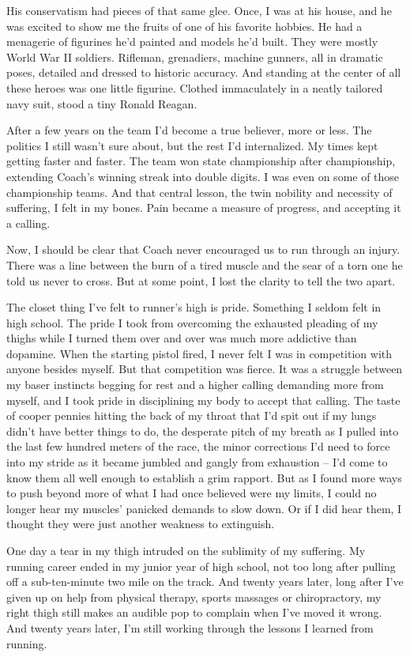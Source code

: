 \documentclass[12pt, oneside]{memoir}
\begin{document}
His conservatism had pieces of that same glee.
Once, I was at his house, and he was excited to show me the fruits of
one of his favorite hobbies.
He had a menagerie of figurines he'd painted and models he'd built.
They were mostly World War II soldiers.
Rifleman, grenadiers, machine gunners, all in dramatic poses, detailed
and dressed to historic accuracy.
And standing at the center of all these heroes was one little figurine.
Clothed immaculately in a neatly tailored navy suit, stood a tiny
Ronald Reagan. 

After a few years on the team I'd become a true believer, more or
less.
The politics I still wasn't sure about, but the rest I'd internalized.
My times kept getting faster and faster.
The team won state championship after championship, extending Coach's
winning streak into double digits.
I was even on some of those championship teams.
And that central lesson, the twin nobility and necessity of suffering,
I felt in my bones.
Pain became a measure of progress, and accepting it a calling.

Now, I should be clear that Coach never encouraged us to run through an
injury.
There was a line between the burn of a tired muscle and the sear of a
torn one he told us never to cross.
But at some point, I lost the clarity to tell the two apart.

The closet thing I've felt to runner's high is pride.
Something I seldom felt in high school.
The pride I took from overcoming the exhausted pleading of my thighs
while I turned them over and over was much more addictive than
dopamine.
When the starting pistol fired, I never felt I was in competition with
anyone besides myself.
But that competition was fierce.
It was a struggle between my baser instincts begging for rest and a
higher calling demanding more from myself, and I took pride in
disciplining my body to accept that calling.
The taste of cooper pennies hitting the back of my throat that I'd
spit out if my lungs didn't have better things to do, the desperate
pitch of my breath as I pulled into the last few hundred meters of the
race, the minor corrections I'd need to force into my stride as it
became jumbled and gangly from exhaustion -- I'd come to know them
all well enough to establish a grim rapport.
But as I found more ways to push beyond more of what I had once
believed were my limits, I could no longer hear my muscles' panicked
demands to slow down. 
Or if I did hear them, I thought they were just another weakness to
extinguish. 

One day a tear in my thigh intruded on the sublimity of my suffering.
My running career ended in my junior year of high school, not too long
after pulling off a sub-ten-minute two mile on the track.
And twenty years later, long after I've given up on help from physical
therapy, sports massages or chiropractory, my right thigh still makes
an audible pop to complain when I've moved it wrong.
And twenty years later, I'm still working through the lessons I
learned from running.
\end{document}

